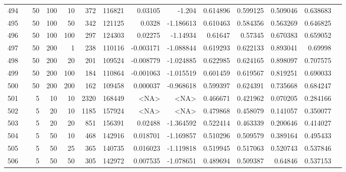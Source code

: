 \begin{longtable}{llrrrrrrrrrrrr}
		494 & &           50 &               100 &           10 &          372 &     116821 &   0.03105 &    -1.204 &  0.614896 &    0.599125 &       0.509046 &  0.638683 \\
		495 & &           50 &               100 &           50 &          342 &     121125 &    0.0328 & -1.186613 &  0.610463 &    0.584356 &       0.563269 &  0.646825 \\
		496 & &           50 &               100 &          100 &          297 &     124303 &   0.02275 &  -1.14934 &   0.61647 &     0.57345 &       0.670383 &  0.659052 \\
		497 & &           50 &               200 &            1 &          238 &     110116 & -0.003171 & -1.088844 &  0.619293 &    0.622133 &       0.893041 &   0.69998 \\
		498 & &           50 &               200 &           20 &          201 &     109524 & -0.008779 & -1.024885 &  0.622985 &    0.624165 &       0.898097 &  0.707575 \\
		499 & &           50 &               200 &          100 &          184 &     110864 & -0.001063 & -1.015519 &  0.601459 &    0.619567 &       0.819251 &  0.690033 \\
		500 & &           50 &               200 &          200 &          162 &     109458 &  0.000037 & -0.968618 &  0.599397 &    0.624391 &       0.735668 &  0.684247 \\\midrule
		501 & \multirow[t]{84}{*}{\rotatebox[origin=r]{90}{use-default}} &            5 &                10 &           10 &        2320 &     168449 &      <NA> &      <NA> &  0.466671 &    0.421962 &       0.070205 &  0.284166 \\
		502 & &            5 &                20 &           10 &           1185 &     157924 &      <NA> &      <NA> &  0.479868 &    0.458079 &       0.141057 &  0.350077 \\
		503 & &            5 &                20 &           20 &         851 &     156391 &   0.02488 & -1.364592 &  0.522414 &    0.463339 &       0.200646 &  0.414027 \\
		504 & &            5 &                50 &           10 &         468 &     142916 &  0.018701 & -1.169857 &  0.510296 &    0.509579 &       0.389164 &  0.495433 \\
		505 & &            5 &                50 &           25 &         365 &     140735 &  0.016023 & -1.119818 &  0.519945 &    0.517063 &       0.520743 &  0.537846 \\
		506 & &            5 &                50 &           50 &         305 &     142972 &  0.007535 & -1.078651 &  0.489694 &    0.509387 &        0.64846 &  0.537153 \\

\end{longtable}
